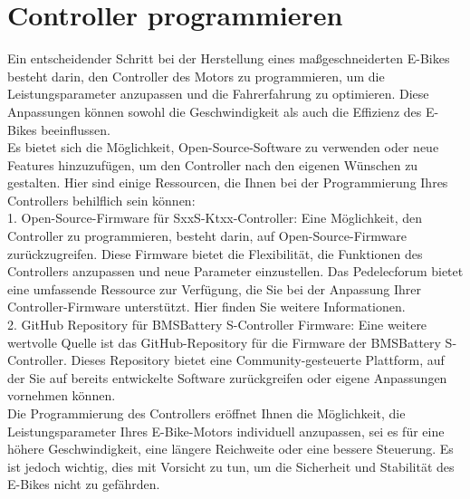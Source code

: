 
\chapter{Controller programmieren}
Ein entscheidender Schritt bei der Herstellung eines maßgeschneiderten E-Bikes besteht darin, den Controller des Motors zu programmieren, um die Leistungsparameter anzupassen und die Fahrerfahrung zu optimieren. Diese Anpassungen können sowohl die Geschwindigkeit als auch die Effizienz des E-Bikes beeinflussen.\\

Es bietet sich die Möglichkeit, Open-Source-Software zu verwenden oder neue Features hinzuzufügen, um den Controller nach den eigenen Wünschen zu gestalten. Hier sind einige Ressourcen, die Ihnen bei der Programmierung Ihres Controllers behilflich sein können:\\

    1. Open-Source-Firmware für SxxS-Ktxx-Controller: Eine Möglichkeit, den Controller zu programmieren, besteht darin, auf Open-Source-Firmware zurückzugreifen. Diese Firmware bietet die Flexibilität, die Funktionen des Controllers anzupassen und neue Parameter einzustellen. Das Pedelecforum bietet eine umfassende Ressource zur Verfügung, die Sie bei der Anpassung Ihrer Controller-Firmware unterstützt. Hier finden Sie weitere Informationen.\\

    2. GitHub Repository für BMSBattery S-Controller Firmware: Eine weitere wertvolle Quelle ist das GitHub-Repository für die Firmware der BMSBattery S-Controller. Dieses Repository bietet eine Community-gesteuerte Plattform, auf der Sie auf bereits entwickelte Software zurückgreifen oder eigene Anpassungen vornehmen können.\\

Die Programmierung des Controllers eröffnet Ihnen die Möglichkeit, die Leistungsparameter Ihres E-Bike-Motors individuell anzupassen, sei es für eine höhere Geschwindigkeit, eine längere Reichweite oder eine bessere Steuerung. Es ist jedoch wichtig, dies mit Vorsicht zu tun, um die Sicherheit und Stabilität des E-Bikes nicht zu gefährden.\\


